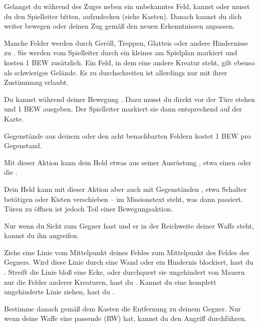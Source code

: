 {			Gelangst du während des Zuges neben ein unbekanntes Feld, kannst oder musst du den Spielleiter bitten, aufzudecken (siehe Kasten). Danach kannst du dich weiter bewegen oder deinen Zug gemäß den neuen Erkenntnissen anpassen.

			Manche Felder werden durch Geröll, Treppen, Glatteis oder andere Hindernisse zu . Sie werden vom Spielleiter durch ein kleines  am Spielplan markiert und kosten 1 BEW zusätzlich. Ein Feld, in dem eine andere Kreatur steht, gilt ebenso als schwieriges Gelände. Es zu durchschreiten ist allerdings nur mit ihrer Zustimmung erlaubt.

			Du kannst während deiner Bewegung . Dazu musst du direkt vor der Türe stehen und 1 BEW ausgeben. Der Spielleiter markiert sie dann entsprechend auf der Karte.

			Gegenstände aus deinem oder den acht benachbarten Feldern  kostet 1 BEW pro Gegenstand.

			Mit dieser Aktion kann dein Held etwas aus seiner Ausrüstung , etwa einen  oder die .

			Dein Held kann mit dieser Aktion aber auch mit Gegenständen , etwa Schalter betätigen oder Kisten verschieben -- im Missionstext steht, was dann passiert. Türen zu öffnen ist jedoch Teil einer Bewegungsaktion.

			Nur wenn du Sicht zum Gegner hast und er in der Reichweite deiner Waffe steht, kannst du ihn angreifen.

			Ziehe eine Linie vom Mittelpunkt deines Feldes zum Mittelpunkt des Feldes des Gegners. Wird diese Linie durch eine Wand oder ein Hindernis blockiert, hast du . Streift die Linie bloß eine Ecke, oder durchquert sie ungehindert von Mauern nur die Felder anderer Kreaturen, hast du . Kannst du eine komplett ungehinderte Linie ziehen, hast du .

			Bestimme danach gemäß dem Kasten  die Entfernung zu deinem Gegner. Nur wenn deine Waffe eine passende  (RW) hat, kannst du den Angriff durchführen.

}
